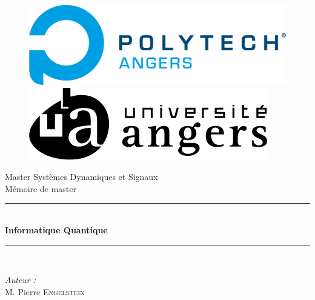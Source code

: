 \documentclass[12pt,a4paper]{report}
\begin{document}
\begin{titlepage}
    \begin{center}
      \begin{figure}[!tbp]
        \centering
        \begin{minipage}[b]{0.4\textwidth}
          \includegraphics[width=\textwidth]{Polytech_Angers.png}
        \end{minipage}
        \hfill
        \begin{minipage}[b]{0.4\textwidth}
          \includegraphics[width=\textwidth]{LogoUnivAngers.png}
        \end{minipage}
      \end{figure}
      {\large Master Systèmes Dynamiques et Signaux}\\[0.5cm]
      {\large Mémoire de master}\\[0.5cm]
      \rule{\linewidth}{0.5mm} \\[0.4cm]
      { \huge \bfseries Informatique Quantique \\[0.4cm] }
      \rule{\linewidth}{0.5mm} \\[1.5cm]
      \noindent
      \begin{minipage}{0.4\textwidth}
        \begin{flushleft} \normalsize
          \emph{Auteur :}\\
          M. Pierre \textsc{Engelstein}\\
          \end{flushleft}
          \end{minipage}%
          \begin{minipage}{0.4\textwidth}
          \begin{flushright} \normalsize

\end{flushright}
\end{minipage}
\end{center}
\end{titlepage}
\end{document}
